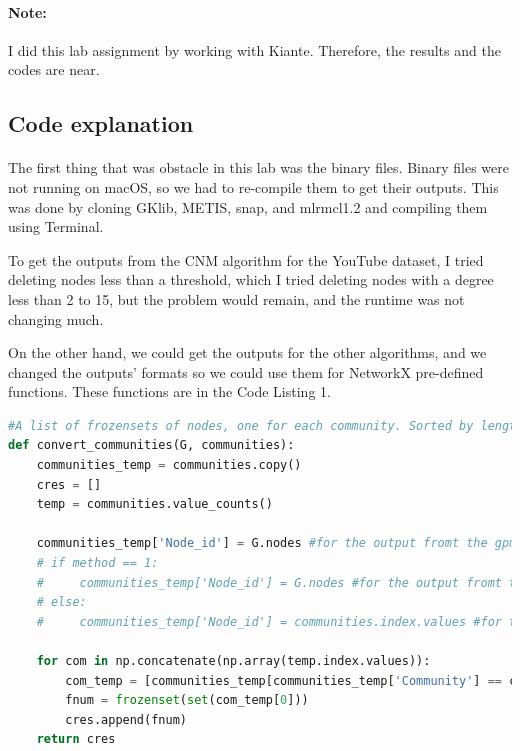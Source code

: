 \documentclass[letterpaper, 11pt]{article}
\newcommand{\1}{\mathds{1}}	%
\theoremstyle{definition}
\begin{document}
\paragraph{Note:}I did this lab assignment by working with Kiante. Therefore, the results and the codes are near.
\subsection*{Code explanation}

\paragraph{}The first thing that was obstacle in this lab was the binary files. Binary files were not running on macOS, so we had to re-compile them to get their outputs. This was done by cloning GKlib, METIS, snap, and mlrmcl1.2 and compiling them using Terminal.

To get the outputs from the CNM algorithm for the YouTube dataset, I tried deleting nodes less than a threshold, which I tried deleting nodes with a degree less than 2 to 15, but the problem would remain, and the runtime was not changing much.

On the other hand, we could get the outputs for the other algorithms, and we changed the outputs' formats so we could use them for NetworkX pre-defined functions. These functions are in the Code Listing 1.

\begin{lstlisting}[language=python, caption={Functions for output formats}, label={lst:Pycode}]
#A list of frozensets of nodes, one for each community. Sorted by length with largest communities first.
def convert_communities(G, communities):
    communities_temp = communities.copy()
    cres = []
    temp = communities.value_counts()
    
    communities_temp['Node_id'] = G.nodes #for the output fromt the gpmetis | mlrmcl
    # if method == 1:
    #     communities_temp['Node_id'] = G.nodes #for the output fromt the gpmetis | mlrmcl
    # else: 
    #     communities_temp['Node_id'] = communities.index.values #for the CNM

    for com in np.concatenate(np.array(temp.index.values)):
        com_temp = [communities_temp[communities_temp['Community'] == com]['Node_id'].values]
        fnum = frozenset(set(com_temp[0]))
        cres.append(fnum)
    return cres

\end{lstlisting}
\newpage
\end{document}
